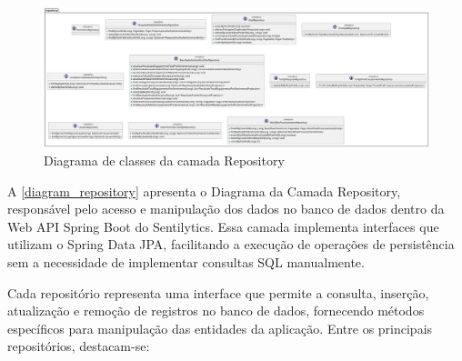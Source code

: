 \documentclass[
	12pt,				%
	oneside,			%
	a4paper,			%
	english,			%
	french,				%
	spanish,			%
	brazil				%
	]{abntex2}
\begin{document}
\begin{figure}[htbp]
\hypertarget{diagram_repository}{%
\caption{Diagrama de classes da camada Repository}\label{diagram_repository}
\begin{center}
\includegraphics[scale=0.2]{imagens/sentilytics/diagramas/classes/repository-classes.png}
\end{center}
}
\end{figure}

A \autoref{diagram_repository} apresenta o Diagrama da Camada
Repository, responsável pelo acesso e manipulação dos dados no banco de
dados dentro da Web API Spring Boot do Sentilytics. Essa camada
implementa interfaces que utilizam o Spring Data JPA, facilitando a
execução de operações de persistência sem a necessidade de implementar
consultas SQL manualmente.

Cada repositório representa uma interface que permite a consulta,
inserção, atualização e remoção de registros no banco de dados,
fornecendo métodos específicos para manipulação das entidades da
aplicação. Entre os principais repositórios, destacam-se:
\end{document}
